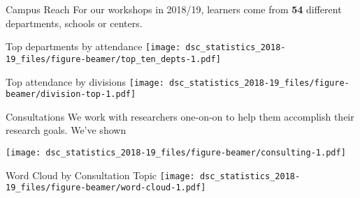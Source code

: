 \documentclass[
  ignorenonframetext,
]{beamer}
\begin{document}
\begin{frame}{Campus Reach}
\protect\hypertarget{campus-reach}{}
For our workshops in 2018/19, learners come from \textbf{54} different
departments, schools or centers.
\end{frame}

\begin{frame}{Top departments by attendance}
\protect\hypertarget{top-departments-by-attendance}{}
\texttt{[image: dsc\_statistics\_2018-19\_files/figure-beamer/top\_ten\_depts-1.pdf]}
\end{frame}

\begin{frame}{Top attendance by divisions}
\protect\hypertarget{top-attendance-by-divisions}{}
\texttt{[image: dsc\_statistics\_2018-19\_files/figure-beamer/division-top-1.pdf]}
\end{frame}

\begin{frame}{Consultations}
\protect\hypertarget{consultations}{}
We work with researchers one-on-on to help them accomplish their
research goals. We've shown

\texttt{[image: dsc\_statistics\_2018-19\_files/figure-beamer/consulting-1.pdf]}
\end{frame}

\begin{frame}{Word Cloud by Consultation Topic}
\protect\hypertarget{word-cloud-by-consultation-topic}{}
\texttt{[image: dsc\_statistics\_2018-19\_files/figure-beamer/word-cloud-1.pdf]}
\end{frame}
\end{document}
